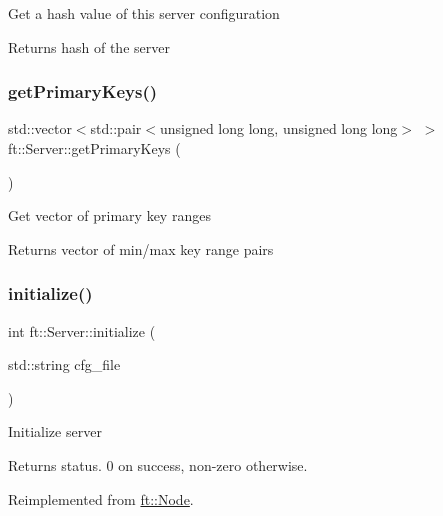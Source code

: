 Get a hash value of this server configuration

\begin{DoxyReturn}{Returns}
hash of the server 
\end{DoxyReturn}
\mbox{\label{classft_1_1Server_a86cc643b14f616c8ba0ecaddbbb696eb}} 
\subsubsection{\texorpdfstring{get\+Primary\+Keys()}{getPrimaryKeys()}}
{\footnotesize\ttfamily std\+::vector$<$std\+::pair$<$unsigned long long, unsigned long long$>$ $>$ ft\+::\+Server\+::get\+Primary\+Keys (\begin{DoxyParamCaption}{ }\end{DoxyParamCaption})\hspace{0.3cm}{\ttfamily [inline]}}

Get vector of primary key ranges

\begin{DoxyReturn}{Returns}
vector of min/max key range pairs 
\end{DoxyReturn}
\mbox{\label{classft_1_1Server_a834002a833999b593d357b72ef69ddcf}} 
\subsubsection{\texorpdfstring{initialize()}{initialize()}}
{\footnotesize\ttfamily int ft\+::\+Server\+::initialize (\begin{DoxyParamCaption}\item[{std\+::string}]{cfg\+\_\+file }\end{DoxyParamCaption})\hspace{0.3cm}{\ttfamily [virtual]}}

Initialize server

\begin{DoxyReturn}{Returns}
status. 0 on success, non-\/zero otherwise. 
\end{DoxyReturn}


Reimplemented from \mbox{\hyperlink{classft_1_1Node_addc92fd2c5cae12a8ea68c30b7202e91}{ft\+::\+Node}}.


